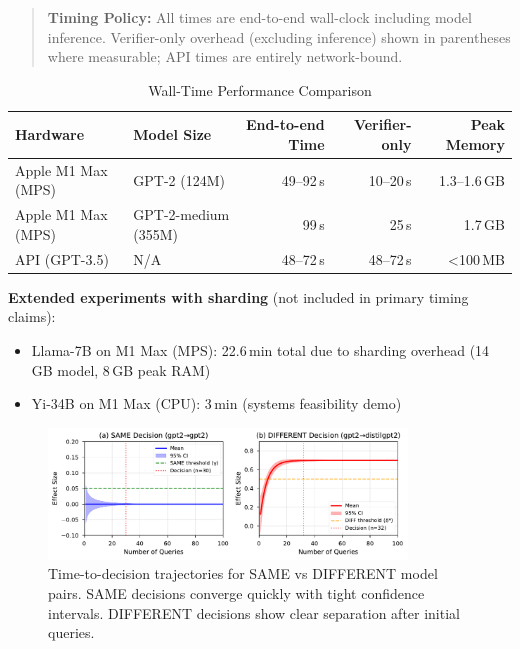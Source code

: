 \documentclass[11pt]{article}
\begin{document}
\begin{quote}
\footnotesize
\textbf{Timing Policy:} All times are end-to-end wall-clock including model inference. Verifier-only overhead (excluding inference) shown in parentheses where measurable; API times are entirely network-bound.
\end{quote}

\begin{table}[t]
\centering
\caption{Wall-Time Performance Comparison}
\label{tab:wall-time}
\small
\begin{tabular}{l l r r r}
\toprule
\textbf{Hardware} & \textbf{Model Size} & \textbf{End-to-end Time} & \textbf{Verifier-only} & \textbf{Peak Memory} \\
\midrule
Apple M1 Max (MPS) & GPT-2 (124M) & 49--92\,s & 10--20\,s & 1.3--1.6\,GB \\
Apple M1 Max (MPS) & GPT-2-medium (355M) & 99\,s & 25\,s & 1.7\,GB \\
API (GPT-3.5) & N/A & 48--72\,s & 48--72\,s & <100\,MB \\
\bottomrule
\end{tabular}
\end{table}

\textbf{Extended experiments with sharding} (not included in primary timing claims):
\begin{itemize}
\item Llama-7B on M1 Max (MPS): 22.6\,min total due to sharding overhead (14\,GB model, 8\,GB peak RAM)
\item Yi-34B on M1 Max (CPU): 3\,min (systems feasibility demo)
\end{itemize}

\begin{figure}[t]
\centering
\includegraphics[width=0.85\textwidth]{figures/fig1_time_to_decision.pdf}
\caption{Time-to-decision trajectories for SAME vs DIFFERENT model pairs. SAME decisions converge quickly with tight confidence intervals. DIFFERENT decisions show clear separation after initial queries.}
\label{fig:time-to-decision}
\end{figure}
\end{document}
